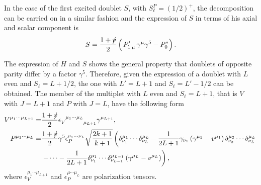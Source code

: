 In the case of the first excited doublet $S$, with $S_\ell^P = (1/2)^+$, the decomposition can be carried on in a similar fashion and the expression of $S$ in terms of his axial and scalar component is 
\begin{equation}
  S = \frac{1 + \slashed{v}}{2} \left( \left. P^\prime_1 \right._\mu \gamma^\mu \gamma^5 - P^*_0 \right) .
  \label{eq:S_doublet}
\end{equation}

The expression of $H$ and $S$ shows the general property that doublets of opposite parity differ by a factor $\gamma^5$. Therefore, given the expression of a doublet with $L$ even and $S_\ell = L + 1/2$, the one with $L' = L + 1$ and $S_\ell = L' - 1/2$ can be obtained. The member of the multiplet with $L$ even and $S_\ell = L + 1$, that is $V$ with $J = L+1$ and $P$ with $J = L$, have the following form
\begin{subequations}
  \begin{align}
    V^{\mu_1 \cdots \mu_{L+1}} =& \frac{1 + \slashed{v}}{2} \epsilon\indices{_V^{\mu_1 \cdots \mu_L}_{\mu_{L+1}}} \gamma^{\mu_{L+1}} , \\
    P^{\mu_1 \cdots \mu_L} =& \frac{1 + \slashed{v}}{2} \gamma^5 \epsilon_P^{\nu_1 \cdots \nu_L} \sqrt{\frac{2 k + 1}{k + 1}} \left( \delta^{\mu_1}_{\nu_1} \cdots \delta^{\mu_L}_{\nu_L} - \frac{1}{2 L + 1} \gamma_{\nu_1} \left( \gamma^{\mu_1} - v^{\mu_1} \right) \delta^{\mu_2}_{\nu_2} \cdots \delta^{\mu_L}_{\nu_L} \right. \nonumber \\ 
    \phantom{P^{\mu_1 \cdots \mu_L} =} & \left. - \cdots - \frac{1}{2 L + 1} \delta^{\mu_1}_{\nu_1} \cdots \delta^{\mu_{L - 1}}_{\nu_{L - 1}} \left( \gamma^{\mu_L} - v^{\mu_L} \right) \right) ,
  \end{align}
\end{subequations}
where $\epsilon_V^{\mu_1 \cdots \mu_{L+1}}$ and $\epsilon_P^{\mu \cdots \mu_{L}}$ are polarization tensors.
